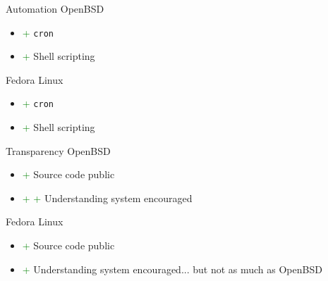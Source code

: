 \documentclass{beamer}
\newcommand{\good}{\textcolor{green}{+ }}
\begin{document}
			\begin{frame}{Automation}
				OpenBSD
				\begin{itemize}
					\item \good \texttt{cron}
					\item \good Shell scripting
				\end{itemize}
				Fedora Linux
				\begin{itemize}
					\item \good \texttt{cron}
					\item \good Shell scripting
				\end{itemize}
			\end{frame}
			\begin{frame}{Transparency}
				OpenBSD
				\begin{itemize}
					\item \good Source code public
					\item \good \good Understanding system encouraged
				\end{itemize}
				Fedora Linux
				\begin{itemize}
					\item \good Source code public
					\item \good Understanding system encouraged... but not as much as OpenBSD
				\end{itemize}
			\end{frame}
\end{document}
